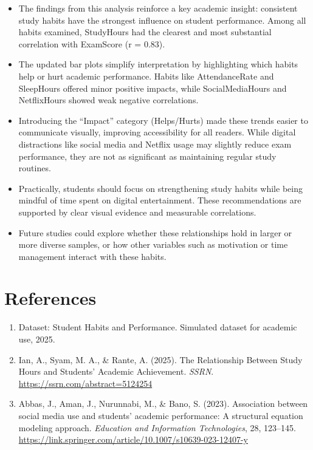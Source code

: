 \documentclass[
  11pt,
  a4paper,
]{article}
\begin{document}
\begin{itemize}
\item
  The findings from this analysis reinforce a key academic insight:
  consistent study habits have the strongest influence on student
  performance. Among all habits examined, StudyHours had the clearest
  and most substantial correlation with ExamScore (r = 0.83).
\item
  The updated bar plots simplify interpretation by highlighting which
  habits help or hurt academic performance. Habits like AttendanceRate
  and SleepHours offered minor positive impacts, while SocialMediaHours
  and NetflixHours showed weak negative correlations.
\item
  Introducing the ``Impact'' category (Helps/Hurts) made these trends
  easier to communicate visually, improving accessibility for all
  readers. While digital distractions like social media and Netflix
  usage may slightly reduce exam performance, they are not as
  significant as maintaining regular study routines.
\item
  Practically, students should focus on strengthening study habits while
  being mindful of time spent on digital entertainment. These
  recommendations are supported by clear visual evidence and measurable
  correlations.
\item
  Future studies could explore whether these relationships hold in
  larger or more diverse samples, or how other variables such as
  motivation or time management interact with these habits.
\end{itemize}

\section{References}\label{references}

\begin{enumerate}
\def\labelenumi{\arabic{enumi}.}
\item
  Dataset: Student Habits and Performance. Simulated dataset for
  academic use, 2025.
\item
  Ian, A., Syam, M. A., \& Rante, A. (2025). The Relationship Between
  Study Hours and Students' Academic Achievement. \emph{SSRN}.
  \url{https://ssrn.com/abstract=5124254}
\item
  Abbas, J., Aman, J., Nurunnabi, M., \& Bano, S. (2023). Association
  between social media use and students' academic performance: A
  structural equation modeling approach. \emph{Education and Information
  Technologies}, 28, 123--145.
  \url{https://link.springer.com/article/10.1007/s10639-023-12407-y}
\end{enumerate}


\printbibliography
\end{document}

